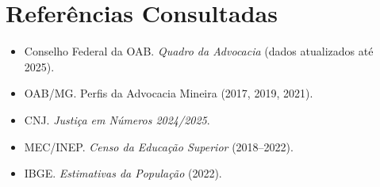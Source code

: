 \documentclass{article}
\begin{document}
\section*{Referências Consultadas}
\begin{itemize}
\item Conselho Federal da OAB. \emph{Quadro da Advocacia} (dados atualizados até 2025).
\item OAB/MG. Perfis da Advocacia Mineira (2017, 2019, 2021).
\item CNJ. \emph{Justiça em Números 2024/2025}.
\item MEC/INEP. \emph{Censo da Educação Superior} (2018--2022).
\item IBGE. \emph{Estimativas da População} (2022).
\end{itemize}
\end{document}
